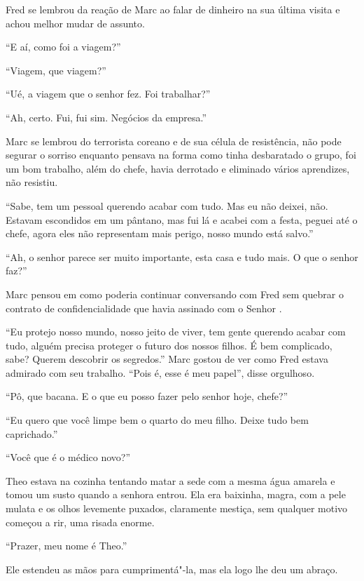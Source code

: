 Fred se lembrou da reação de Marc ao falar de dinheiro na sua última
visita e achou melhor mudar de assunto.

``E aí, como foi a viagem?''

``Viagem, que viagem?''

``Ué, a viagem que o senhor fez. Foi trabalhar?''

``Ah, certo. Fui, fui sim. Negócios da empresa.''

Marc se lembrou do terrorista coreano e de sua célula de resistência,
não pode segurar o sorriso enquanto pensava na forma como tinha
desbaratado o grupo, foi um bom trabalho, além do chefe, havia derrotado
e eliminado vários aprendizes, não resistiu.

``Sabe, tem um pessoal querendo acabar com tudo. Mas eu não deixei, não.
Estavam escondidos em um pântano, mas fui lá e acabei com a festa,
peguei até o chefe, agora eles não representam mais perigo, nosso mundo
está salvo.''

``Ah, o senhor parece ser muito importante, esta casa e tudo mais. O que
o senhor faz?''

Marc pensou em como poderia continuar conversando com Fred sem quebrar o
contrato de confidencialidade que havia assinado com o Senhor .

``Eu protejo nosso mundo, nosso jeito de viver, tem gente querendo
acabar com tudo, alguém precisa proteger o futuro dos nossos filhos. É
bem complicado, sabe? Querem descobrir os segredos.'' Marc gostou de ver
como Fred estava admirado com seu trabalho. ``Pois é, esse é meu
papel'', disse orgulhoso.

``Pô, que bacana. E o que eu posso fazer pelo senhor hoje, chefe?''

``Eu quero que você limpe bem o quarto do meu filho. Deixe tudo bem
caprichado.''

\asterisc


``Você que é o médico novo?''

Theo estava na cozinha tentando matar a sede com a mesma água amarela e
tomou um susto quando a senhora entrou. Ela era baixinha, magra, com a
pele mulata e os olhos levemente puxados, claramente mestiça, sem
qualquer motivo começou a rir, uma risada enorme.

``Prazer, meu nome é Theo.''

Ele estendeu as mãos para cumprimentá"-la, mas ela logo lhe deu um
abraço.

